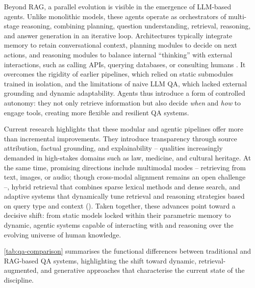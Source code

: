 \begin{spacing}{1.5}
Beyond RAG, a parallel evolution is visible in the emergence of LLM-based agents. Unlike monolithic models, these agents operate as orchestrators of multi-stage reasoning, combining planning, question understanding, retrieval, reasoning, and answer generation in an iterative loop. Architectures typically integrate memory to retain conversational context, planning modules to decide on next actions, and reasoning modules to balance internal ``thinking'' with external interactions, such as calling APIs, querying databases, or consulting humans \parencite{yue_survey_2025}. It overcomes the rigidity of earlier pipelines, which relied on static submodules trained in isolation, and the limitations of naive LLM QA, which lacked external grounding and dynamic adaptability. Agents thus introduce a form of controlled autonomy: they not only retrieve information but also decide \textit{when} and \textit{how} to engage tools, creating more flexible and resilient QA systems.

Current research highlights that these modular and agentic pipelines offer more than incremental improvements. They introduce transparency through source attribution, factual grounding, and explainability -- qualities increasingly demanded in high-stakes domains such as law, medicine, and cultural heritage. At the same time, promising directions include multimodal modes -- retrieving from text, images, or audio; though cross-modal alignment remains an open challenge \citep{vaibhav_retrieval-augmented_2025} --, hybrid retrieval that combines sparse lexical methods and dense search, and adaptive systems that dynamically tune retrieval and reasoning strategies based on query type and context (\cite{yue_survey_2025,vaibhav_retrieval-augmented_2025}). Taken together, these advances point toward a decisive shift: from static models locked within their parametric memory to dynamic, agentic systems capable of interacting with and reasoning over the evolving universe of human knowledge.

\autoref{tab:qa-comparison} summarises the functional differences between traditional and RAG-based QA systems, highlighting the shift toward dynamic, retrieval-augmented, and generative approaches that characterise the current state of the discipline. 


\end{spacing}
